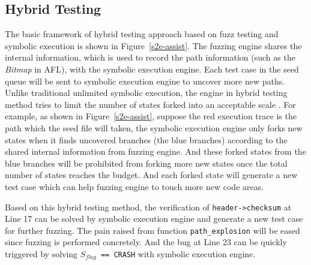 \subsection{Hybrid Testing}
The basic framework of hybrid testing approach based on fuzz testing and symbolic execution is shown in Figure~\ref{s2e-assist}. The fuzzing engine shares the internal information, which is used to record the path information (such as the \textit{Bitmap} in AFL), with the symbolic execution engine. 
Each test case in the seed queue will be sent to symbolic execution engine to uncover more new paths. 
Unlike traditional unlimited symbolic execution, the engine in hybrid testing method tries to limit the number of states forked into an acceptable scale \cite{stephens2016driller}. For example, as shown in Figure~\ref{s2e-assist}, suppose the red execution trace is the path which the seed file will taken, the symbolic execution engine only forks new states when it finds uncovered branches (the blue branches) according to the shared internal information from fuzzing engine. And these forked states from the blue branches will be prohibited from forking more new states once the total number of states reaches the budget. And each forked state will generate a new test case which can help fuzzing engine to touch more new code areas. 

Based on this hybrid testing method, the verification of \texttt{header->checksum} at Line 17 can be solved by symbolic execution engine and generate a new test case for further fuzzing.
 The pain raised from function \texttt{path\_explosion} will be eased since fuzzing is performed concretely. 
 And the bug at Line 23 can be quickly triggered by solving \texttt{$S_{flag}$ == CRASH} with symbolic execution engine.